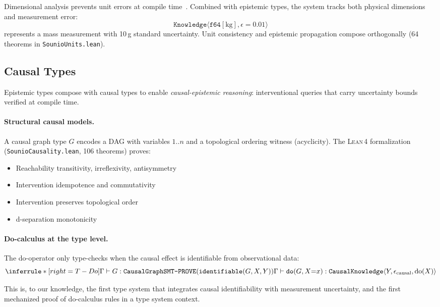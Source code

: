 \documentclass[acmsmall,screen,review,anonymous]{acmart}
\newcommand{\know}[1]{\texttt{Knowledge}\langle #1 \rangle}
\newcommand{\cknow}[3]{\texttt{CausalKnowledge}\langle #1, #2, #3 \rangle}
\newcommand{\eps}{\epsilon}
\newcommand{\lean}{\textsc{Lean\,4}\xspace}
\begin{document}
Dimensional analysis prevents unit errors at compile time~\cite{kennedy2009units}.
Combined with epistemic types, the system tracks both physical
dimensions and measurement error:
\[
\know{\texttt{f64}[\text{kg}], \eps=0.01}
\]
represents a mass measurement with 10\,g standard uncertainty.
Unit consistency and epistemic propagation compose orthogonally
(64 theorems in \texttt{SounioUnits.lean}).

\subsection{Causal Types}
\label{sec:causal}

Epistemic types compose with causal types to enable
\emph{causal-epistemic reasoning}: interventional queries that
carry uncertainty bounds verified at compile time.

\paragraph{Structural causal models.}
A causal graph type $G$ encodes a DAG with variables $1..n$
and a topological ordering witness (acyclicity).
The \lean formalization (\texttt{SounioCausality.lean}, 106 theorems)
proves:
\begin{itemize}
  \item Reachability transitivity, irreflexivity, antisymmetry
  \item Intervention idempotence and commutativity
  \item Intervention preserves topological order
  \item d-separation monotonicity
\end{itemize}

\paragraph{Do-calculus at the type level.}
The do-operator only type-checks when the causal effect is
identifiable from observational data:
\[
\inferrule*[right=T-Do]
  {\Gamma \vdash G : \texttt{CausalGraph} \\
   \texttt{SMT-PROVE}(\texttt{identifiable}(G, X, Y))}
  {\Gamma \vdash \texttt{do}(G, X{=}x) :
   \cknow{Y}{\eps_{\text{causal}}}{\text{do}(X)}}
\]

This is, to our knowledge, the first type system that integrates
causal identifiability with measurement uncertainty, and the first
mechanized proof of do-calculus rules in a type system context.
\end{document}
